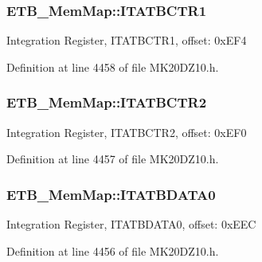 \subsubsection[{\texorpdfstring{I\+T\+A\+T\+B\+C\+T\+R1}{ITATBCTR1}}]{ E\+T\+B\+\_\+\+Mem\+Map\+::\+I\+T\+A\+T\+B\+C\+T\+R1}\hypertarget{struct_e_t_b___mem_map_af2f4b9c2591e22c26c35cf21bf023f32}{}\label{struct_e_t_b___mem_map_af2f4b9c2591e22c26c35cf21bf023f32}
Integration Register, I\+T\+A\+T\+B\+C\+T\+R1, offset\+: 0x\+E\+F4 

Definition at line 4458 of file M\+K20\+D\+Z10.\+h.

\subsubsection[{\texorpdfstring{I\+T\+A\+T\+B\+C\+T\+R2}{ITATBCTR2}}]{ E\+T\+B\+\_\+\+Mem\+Map\+::\+I\+T\+A\+T\+B\+C\+T\+R2}\hypertarget{struct_e_t_b___mem_map_a1c0bbc031154c0fb2c335b4cffadb9e5}{}\label{struct_e_t_b___mem_map_a1c0bbc031154c0fb2c335b4cffadb9e5}
Integration Register, I\+T\+A\+T\+B\+C\+T\+R2, offset\+: 0x\+E\+F0 

Definition at line 4457 of file M\+K20\+D\+Z10.\+h.

\subsubsection[{\texorpdfstring{I\+T\+A\+T\+B\+D\+A\+T\+A0}{ITATBDATA0}}]{ E\+T\+B\+\_\+\+Mem\+Map\+::\+I\+T\+A\+T\+B\+D\+A\+T\+A0}\hypertarget{struct_e_t_b___mem_map_a7dfaed9b0dca763ce269813543c7bf83}{}\label{struct_e_t_b___mem_map_a7dfaed9b0dca763ce269813543c7bf83}
Integration Register, I\+T\+A\+T\+B\+D\+A\+T\+A0, offset\+: 0x\+E\+EC 

Definition at line 4456 of file M\+K20\+D\+Z10.\+h.

